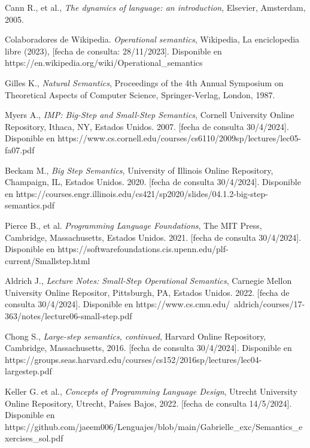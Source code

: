 \begin{thebibliography}{11}
    \bibitem{}
    \label{sec:99}
    \hypertarget{99}{}
    Cann R., et al., \textit{The dynamics of language: an introduction}, Elsevier, Amsterdam, 2005.

    \bibitem{}
    \label{sec:100}
    \hypertarget{100}{}
    Colaboradores de Wikipedia. \textit{Operational semantics}, Wikipedia, La enciclopedia libre (2023), [fecha de consulta: 28/11/2023]. Disponible en https://en.wikipedia.org/wiki/Operational\_semantics

    \bibitem{}
    \label{sec:101}
    \hypertarget{101}{}
    Gilles K., \textit{Natural Semantics}, Proceedings of the 4th Annual Symposium on Theoretical Aspects of Computer Science, Springer-Verlag, London, 1987.

    \bibitem{}
    \label{sec:102}
    \hypertarget{102}{}
    Myers A., \textit{IMP: Big-Step and Small-Step Semantics}, Cornell University Online Repository,  Ithaca, NY, Estados Unidos. 2007. [fecha de consulta 30/4/2024]. Disponible en https://www.cs.cornell.edu/courses/cs6110/2009sp/lectures/lec05-fa07.pdf

    \bibitem{}
    \label{sec:103}
    \hypertarget{103}{}
    Beckam M., \textit{Big Step Semantics}, University of Illinois Online Repository, Champaign, IL, Estados Unidos. 2020. [fecha de consulta 30/4/2024]. Disponible en  https://courses.engr.illinois.edu/cs421/sp2020/slides/04.1.2-big-step-semantics.pdf

    \bibitem{}
    \label{sec:104}
    \hypertarget{104}{}
    Pierce B., et al. \textit{Programming Language Foundations}, The MIT Press, Cambridge, Massachusetts, Estados Unidos. 2021. [fecha de consulta 30/4/2024]. Disponible en  https://softwarefoundations.cis.upenn.edu/plf-current/Smallstep.html

    \bibitem{}
    \label{sec:105}
    \hypertarget{105}{}
    Aldrich J., \textit{Lecture Notes: Small-Step Operational Semantics}, Carnegie Mellon University Online Repositor, Pittsburgh, PA, Estados Unidos. 2022.  [fecha de consulta 30/4/2024]. Disponible en https://www.cs.cmu.edu/~aldrich/courses/17-363/notes/lecture06-small-step.pdf

     \bibitem{}
    \label{sec:106}
    \hypertarget{106}{}
    Chong S., \textit{Large-step semantics, continued},  Harvard Online Repository, Cambridge, Massachusetts, 2016.  [fecha de consulta 30/4/2024]. Disponible en  https://groups.seas.harvard.edu/courses/cs152/2016sp/lectures/lec04-largestep.pdf

     \bibitem{}
    \label{sec:107}
    \hypertarget{107}{}
    Keller G. et al., \textit{Concepts of Programming Language Design}, Utrecht University Online Repository, Utrecht, Países Bajos, 2022.  [fecha de consulta 14/5/2024]. Disponible en https://github.com/jaeem006/Lenguajes/blob/main/Gabrielle\_exc/Semantics\_exercises\_sol.pdf


\end{thebibliography}
